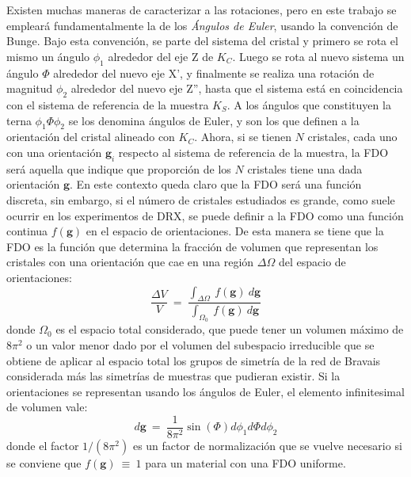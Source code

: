 Existen muchas maneras de caracterizar a las rotaciones, pero en este trabajo se empleará fundamentalmente la de los \textit{Ángulos de Euler}, usando la convención de Bunge\cite{bunge2013texture}.
Bajo esta convención, se parte del sistema del cristal y primero se rota el mismo un ángulo $\phi_1$ alrededor del eje Z de $K_C$.
Luego se rota al nuevo sistema un ángulo $\Phi$ alrededor del nuevo eje X', y finalmente se realiza una rotación de magnitud $\phi_2$ alrededor del nuevo eje Z'', hasta que el sistema está en coincidencia con el sistema de referencia de la muestra $K_S$.
A los ángulos que constituyen la terna $\phi_1 \Phi \phi_2$ se los denomina ángulos de Euler, y son los que definen a la orientación del cristal alineado con $K_C$.
Ahora, si se tienen $N$ cristales, cada uno con una orientación $\mathbf{g}_i$ respecto al sistema de referencia de la muestra, la FDO será aquella que indique que proporción de los $N$ cristales tiene una dada orientación $\mathbf{g}$. 
En este contexto queda claro que la FDO será una función discreta, sin embargo, si el número de cristales estudiados es grande, como suele ocurrir en los experimentos de DRX, se puede definir a la FDO como una función continua $f(\mathbf{g})$ en el espacio de orientaciones.
De esta manera se tiene que la FDO es la función que determina la fracción de volumen que representan los cristales con una orientación que cae en una región $\Delta \Omega$ del espacio de orientaciones\cite{kocks2000texture}:
\begin{equation}
  \frac{\Delta V}{V} \ = \ \frac{\int_{\Delta \Omega} \ f(\mathbf{g}) \ d\mathbf{g}}{\int_{\Omega_0} \ f(\mathbf{g})\ d\mathbf{g}}
  \label{eq:ODF}
\end{equation}
\noindent
donde $\Omega_0$ es el espacio total considerado, que puede tener un volumen máximo de $8\pi^2$ o un valor menor dado por el volumen del subespacio irreducible que se obtiene de aplicar al espacio total los grupos de simetría de la red de Bravais considerada más las simetrías de muestras que pudieran existir.
Si la orientaciones se representan usando los ángulos de Euler, el elemento infinitesimal de volumen vale:
\begin{equation}
  d\mathbf{g} \ = \ \frac{1}{8\pi^2} \sin(\Phi) d\phi_1 d\Phi d\phi_2
  \label{eq:dg}
\end{equation}
\noindent
donde el factor $1/(8\pi^2)$ es un factor de normalización que se vuelve necesario si se conviene que $f(\mathbf{g}) \ \equiv \ 1$ para un material con una FDO uniforme.

